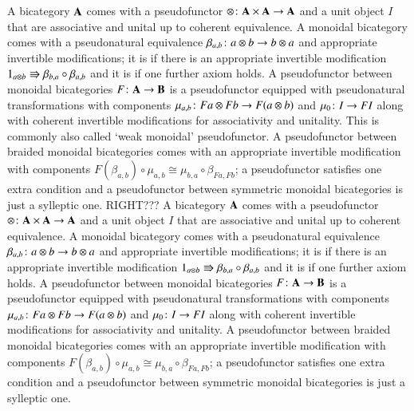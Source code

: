 \documentclass[reqno]{amsart}
\begin{document}
A  bicategory $\mathbf{A}$ comes with a pseudofunctor $\otimes\colon\mathbf{A}\times\mathbf{A}\to\mathbf{A}$ and a unit object $I$ that are associative and unital up to coherent equivalence. A  monoidal bicategory comes with a pseudonatural equivalence $\beta_{a,b}\colon a\otimes b\to b\otimes a$ and appropriate invertible modifications; it is  if there is an appropriate invertible modification $1_{a\otimes b}\Rrightarrow\beta_{b,a}\circ\beta_{a,b}$ and it is  if one further axiom holds. A  pseudofunctor between monoidal bicategories $F\colon\mathbf{A}\to\mathbf{B}$ is a pseudofunctor equipped with pseudonatural transformations with components $\mu_{a,b}\colon Fa\otimes Fb\to F(a\otimes b)$ and $\mu_0\colon I\to FI$ along with coherent invertible modifications for associativity and unitality. This is commonly also called `weak monoidal' pseudofunctor. A  pseudofunctor between braided monoidal bicategories comes with an appropriate invertible modification with components $F(\beta_{a,b})\circ \mu_{a,b}\cong\mu_{b,a}\circ \beta_{Fa,Fb}$; a  pseudofunctor satisfies one extra condition and a  pseudofunctor between symmetric monoidal bicategories is just a sylleptic one. RIGHT???
A  bicategory $\mathbf{A}$ comes with a pseudofunctor $\otimes\colon\mathbf{A}\times\mathbf{A}\to\mathbf{A}$ and a unit object $I$ that are associative and unital up to coherent equivalence. A  monoidal bicategory comes with a pseudonatural equivalence $\beta_{a,b}\colon a\otimes b\to b\otimes a$ and appropriate invertible modifications; it is  if there is an appropriate invertible modification $1_{a\otimes b}\Rrightarrow\beta_{b,a}\circ\beta_{a,b}$ and it is  if one further axiom holds. A  pseudofunctor between monoidal bicategories $F\colon\mathbf{A}\to\mathbf{B}$ is a pseudofunctor equipped with pseudonatural transformations with components $\mu_{a,b}\colon Fa\otimes Fb\to F(a\otimes b)$ and $\mu_0\colon I\to FI$ along with coherent invertible modifications for associativity and unitality.  A  pseudofunctor between braided monoidal bicategories comes with an appropriate invertible modification with components $F(\beta_{a,b})\circ \mu_{a,b}\cong\mu_{b,a}\circ \beta_{Fa,Fb}$; a  pseudofunctor satisfies one extra condition and a  pseudofunctor between symmetric monoidal bicategories is just a sylleptic one. 
\end{document}
